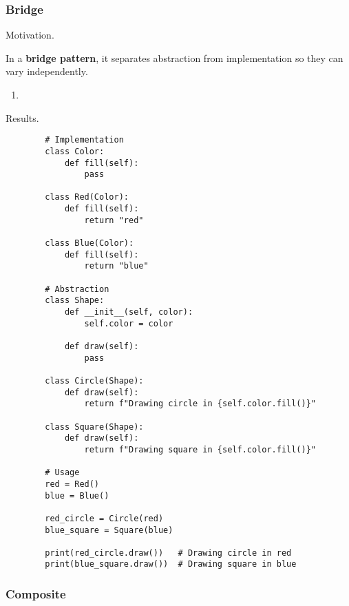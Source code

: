   \subsubsection{Bridge}

    Motivation. 

    \begin{definition}
      In a \textbf{bridge pattern}, it separates abstraction from implementation so they can vary independently. 
      \begin{enumerate}
        \item 
      \end{enumerate}
    \end{definition}

    Results. 

    \begin{example}
      \begin{lstlisting}
        # Implementation
        class Color:
            def fill(self):
                pass

        class Red(Color):
            def fill(self):
                return "red"

        class Blue(Color):
            def fill(self):
                return "blue"

        # Abstraction
        class Shape:
            def __init__(self, color):
                self.color = color
            
            def draw(self):
                pass

        class Circle(Shape):
            def draw(self):
                return f"Drawing circle in {self.color.fill()}"

        class Square(Shape):
            def draw(self):
                return f"Drawing square in {self.color.fill()}"

        # Usage
        red = Red()
        blue = Blue()

        red_circle = Circle(red)
        blue_square = Square(blue)

        print(red_circle.draw())   # Drawing circle in red
        print(blue_square.draw())  # Drawing square in blue
      \end{lstlisting}
    \end{example}

  \subsubsection{Composite}

